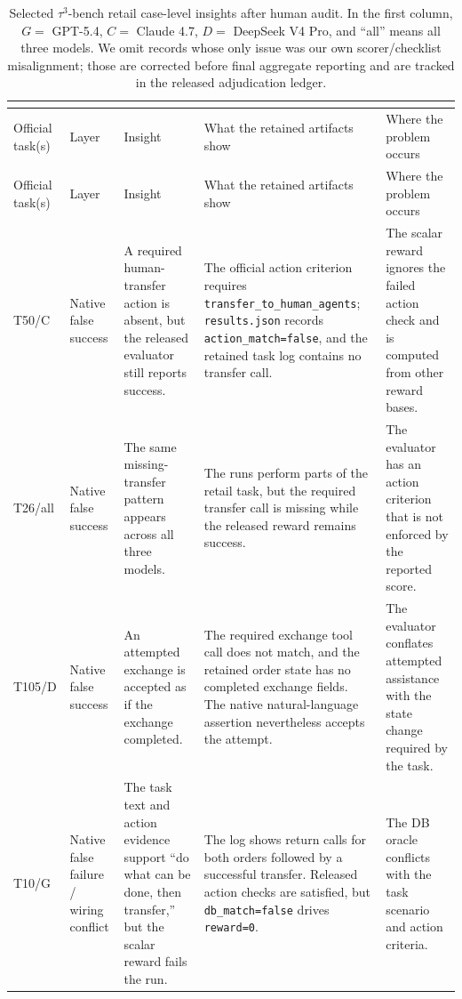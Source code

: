 \begingroup
\scriptsize
\setlength{\tabcolsep}{2.2pt}
\renewcommand{\arraystretch}{1.18}
\begin{longtable}{@{}>{\raggedright\arraybackslash}p{}p{}p{}p{}p{}@{}}
\caption{Selected \(\tau^3\)-bench retail case-level insights after human audit. In the first column, \(G=\) GPT-5.4, \(C=\) Claude 4.7, \(D=\) DeepSeek V4 Pro, and ``all'' means all three models. We omit records whose only issue was our own scorer/checklist misalignment; those are corrected before final aggregate reporting and are tracked in the released adjudication ledger.}\\
\label{tab:tau3-case-insights}\\
\toprule
Official task(s) & Layer & Insight & What the retained artifacts show & Where the problem occurs \\
\midrule
\endfirsthead
\toprule
Official task(s) & Layer & Insight & What the retained artifacts show & Where the problem occurs \\
\midrule
\endhead
T50/C & Native false success & A required human-transfer action is absent, but the released evaluator still reports success. & The official action criterion requires \texttt{transfer\_to\_human\_agents}; \texttt{results.json} records \texttt{action\_match=false}, and the retained task log contains no transfer call. & The scalar reward ignores the failed action check and is computed from other reward bases. \\
T26/all & Native false success & The same missing-transfer pattern appears across all three models. & The runs perform parts of the retail task, but the required transfer call is missing while the released reward remains success. & The evaluator has an action criterion that is not enforced by the reported score. \\
T105/D & Native false success & An attempted exchange is accepted as if the exchange completed. & The required exchange tool call does not match, and the retained order state has no completed exchange fields. The native natural-language assertion nevertheless accepts the attempt. & The evaluator conflates attempted assistance with the state change required by the task. \\
T10/G & Native false failure / wiring conflict & The task text and action evidence support ``do what can be done, then transfer,'' but the scalar reward fails the run. & The log shows return calls for both orders followed by a successful transfer. Released action checks are satisfied, but \texttt{db\_match=false} drives \texttt{reward=0}. & The DB oracle conflicts with the task scenario and action criteria. \\

\end{longtable}
